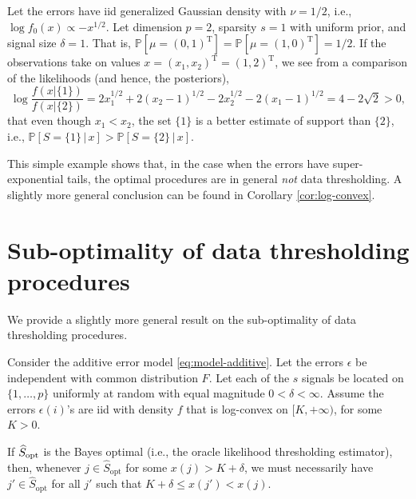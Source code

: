 \begin{example} \label{exmp:suboptimal-data-thresholding}
Let the errors have iid generalized Gaussian density with $\nu=1/2$, i.e., $\log{f_0(x)}\propto -x^{1/2}$. 
Let dimension $p=2$, sparsity $s=1$ with uniform prior, and signal size $\delta=1$.
That is, $\mathbb P[\mu = (0,1)^\mathrm{T}] = \mathbb P[\mu = (1,0)^\mathrm{T}] = 1/2$.
If the observations take on values $x = (x_1, x_2)^\mathrm{T} = (1,2)^\mathrm{T}$, we see from a comparison of the likelihoods (and hence, the posteriors),
$$
\log \frac{f(x|\{1\})}{f(x|\{2\})} = 2x_1^{1/2} + 2(x_2 - 1)^{1/2} - 2x_2^{1/2} - 2(x_1 - 1)^{1/2} = 4 - 2\sqrt{2} > 0,
$$
that even though $x_1<x_2$, the set $\{1\}$ is a better estimate of support than $\{2\}$, i.e., $\mathbb P[S=\{1\}\,\big|\,x] > \mathbb P[S=\{2\}\,\big|\,x]$.
\end{example}

This simple example shows that, in the case when the errors have super-exponential tails, the optimal procedures are in general \emph{not} data thresholding.
A slightly more general conclusion can be found in Corollary \ref{cor:log-convex}.

\section{Sub-optimality of data thresholding procedures}\label{sec:sup-optimality-of-thresholding}

We provide a slightly more general result on the sub-optimality of data thresholding procedures.

\begin{corollary} \label{cor:log-convex}
Consider the additive error model \eqref{eq:model-additive}.
Let the errors $\epsilon$ be independent with common distribution $F$.
Let each of the $s$ signals be located on $\{1,\ldots,p\}$ uniformly at random with equal magnitude $0<\delta<\infty$.
Assume the errors $\epsilon(i)$'s are iid with density $f$ that is log-convex on $[K, +\infty)$, for some $K>0$. 

If $\widehat{S}_{\rm opt}$ is the Bayes optimal (i.e., the oracle likelihood thresholding estimator), then, whenever 
$j\in\widehat{S}_{\text{opt}}$ for some $x(j) > K+\delta$, we must necessarily have $j'\in\widehat{S}_{\text{opt}}$ for 
all $j'$ such that $K+\delta \le x(j') < x(j)$.
\end{corollary} 

